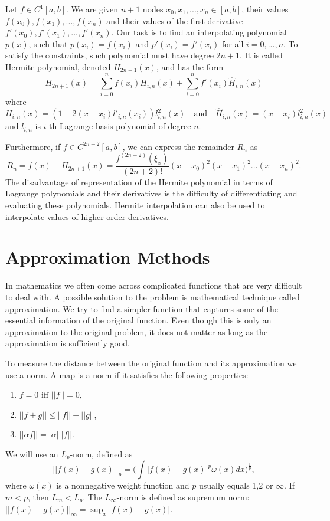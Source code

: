 \documentclass[a4paper,10pt]{article}
\begin{document}
Let $f \in C^1[a,b]$. We are given $n+1$ nodes $x_0, x_1,...,x_n \in [a,b]$, their values $f(x_0), f(x_1),...,f(x_n)$ and their values of the first derivative $f'(x_0), f'(x_1),...,f'(x_n)$. Our task is to find an interpolating polynomial $p(x)$, such that $p(x_i)=f(x_i)$ and $p'(x_i)=f'(x_i)$ for all $i=0,...,n$. To satisfy the constraints, such polynomial must have degree $2n+1$. It is called Hermite polynomial, denoted $H_{2n+1}(x)$, and has the form
$$H_{2n+1}(x)=\sum_{i=0}^{n}f(x_i)H_{i,n}(x)+\sum_{i=0}^{n}f'(x_i)\widehat{H}_{i,n}(x)$$
where $$H_{i,n}(x)=(1-2(x-x_i)l'_{i,n}(x_i))l^2_{i,n}(x) \quad \text{and} \quad \widehat{H}_{i,n}(x)=(x-x_i)l^2_{i,n}(x)$$
and $l_{i,n}$ is $i$-th Lagrange basis polynomial of degree $n$. \cite{hermite}

Furthermore, if $f \in C^{2n+2}[a,b]$, we can express the remainder $R_n$ as $$R_n=f(x)-H_{2n+1}(x)=
\frac{f^{(2n+2)}(\xi_x)}{(2n+2)!}(x-x_0)^2(x-x_1)^2 \dots (x-x_n)^2.$$
The disadvantage of representation of the Hermite polynomial in terms of Lagrange polynomials and their
derivatives is the difficulty of differentiating and evaluating these polynomials. Hermite interpolation can also be used to interpolate values of higher order derivatives. \cite{hermite}

\section{Approximation Methods}
In mathematics we often come across complicated functions that are very difficult to deal with.
A possible solution to the problem is mathematical technique called approximation. We try to find a simpler function that captures some of the essential information of the original function.
Even though this is only an approximation to the original problem, it does not matter as long as the approximation is sufficiently good. \cite{Woodford}

To measure the distance between the original function and its approximation we use a norm. A map is a norm if it satisfies the following properties: \cite{lebesgue}
\begin{enumerate}
\item{$f=0$ iff $||f||=0$,}
\item{$||f+g||\leq||f||+||g||$,}
\item{ $||\alpha f|| =|\alpha| ||f||$.}
\end{enumerate}

We will use an $L_p$-norm, defined as $$||f(x)-g(x)||_p=\Big(\int|f(x)-g(x)|^p\omega(x)dx\Big)^{\frac{1}{p}},$$ where $\omega(x)$ is a nonnegative weight function and $p$ usually equals 1,2 or $\infty$. If $m<p$, then $L_m<L_p$. The $L_\infty$-norm is defined as supremum norm: $||f(x)-g(x)||_{\infty}=\sup_x|f(x)-g(x)|$.
\end{document}
